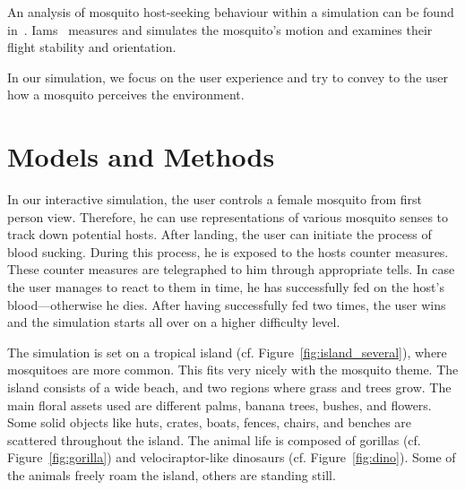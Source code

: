 \documentclass{sig-alternate-05-2015}
\begin{document}
An analysis of mosquito host-seeking behaviour within a simulation can be found in~\cite{iams2014}. Iams~\cite{cummins2012} measures and simulates the mosquito's motion and examines their flight stability and orientation.

In our simulation, we focus on the user experience and try to convey to the user how a mosquito perceives the environment.


\section{Models and Methods}
\label{sec:models}
\noindent
In our interactive simulation, the user controls a female mosquito from first person view. Therefore, he can use representations of various mosquito senses to track down potential hosts. After landing, the user can initiate the process of blood sucking. During this process, he is exposed to the hosts counter measures. These counter measures are telegraphed to him through appropriate tells. In case the user manages to react to them in time, he has successfully fed on the host's blood---otherwise he dies. After having successfully fed two times, the user wins and the simulation starts all over on a higher difficulty level.


The simulation is set on a tropical island (cf. Figure~\ref{fig:island_several}), where mosquitoes are more common. This fits very nicely with the mosquito theme. The island consists of a wide beach, and two regions where grass and trees grow. The main floral assets used are different palms, banana trees, bushes, and flowers. Some solid objects like huts, crates, boats, fences, chairs, and benches are scattered throughout the island. The animal life is composed of gorillas (cf. Figure~\ref{fig:gorilla}) and velociraptor-like dinosaurs (cf. Figure~\ref{fig:dino}). Some of the animals freely roam the island, others are standing still.
\end{document}
